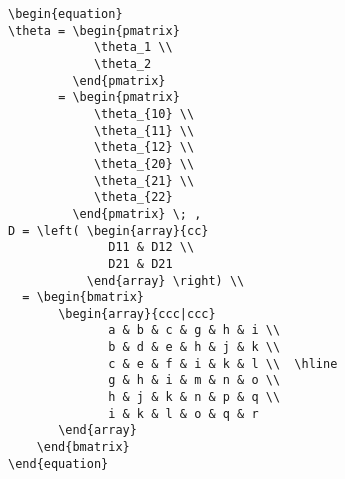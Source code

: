 \documentclass[12pt, a4paper]{article}
\begin{document}
\begin{lstlisting}
\begin{equation}
\theta = \begin{pmatrix}
            \theta_1 \\
            \theta_2 
         \end{pmatrix} 
       = \begin{pmatrix}
            \theta_{10} \\
            \theta_{11} \\
            \theta_{12} \\
            \theta_{20} \\
            \theta_{21} \\
            \theta_{22}
         \end{pmatrix} \; ,
D = \left( \begin{array}{cc}
              D11 & D12 \\
              D21 & D21
           \end{array} \right) \\
  = \begin{bmatrix}
       \begin{array}{ccc|ccc}
              a & b & c & g & h & i \\
              b & d & e & h & j & k \\
              c & e & f & i & k & l \\  \hline
              g & h & i & m & n & o \\
              h & j & k & n & p & q \\
              i & k & l & o & q & r
       \end{array}
    \end{bmatrix}
\end{equation}
\end{lstlisting}
\end{document}
